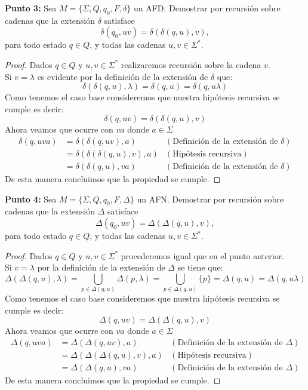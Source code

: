 \textbf{Punto 3: }Sea $M=\{\Sigma,Q,q_0,F,\delta\}$ un AFD. Demostrar por recursión sobre cadenas que la extensión $\delta$ satisface
$$\delta(q_0,uv)=\delta(\delta(q,u),v),$$
para todo estado $q\in Q$, y todas las cadenas $u,v\in\Sigma^*.$
\begin{proof}
Dados $q\in Q$ y $u,v\in\Sigma^*$ realizaremos recursión sobre la cadena $v$.\\
Si $v=\lambda$ es evidente por la definición de la extensión de $\delta$ que:
$$\delta(\delta(q,u),\lambda)=\delta(q,u)=\delta(q,u\lambda)$$
Como tenemos el caso base consideremos que nuestra hipótesis recursiva se cumple es decir:
$$\delta(q,uv)=\delta(\delta(q,u),v)$$ 
Ahora veamos que ocurre con $va$ donde $a\in\Sigma$
\begin{align*}
      \delta(q,uva)&=\delta(\delta(q,uv),a)&(\text{Definición de la extensión de }\delta)\\
      &=\delta(\delta(\delta(q,u),v),a)&(\text{Hipótesis recursiva})\\
      &=\delta(\delta(q,u),va)&(\text{Definición de la extensión de }\delta)
  \end{align*} 
De esta manera concluimos que la propiedad se cumple. 

\end{proof}
\textbf{Punto 4: }Sea $M=\{\Sigma,Q,q_0,F,\Delta\}$ un AFN. Demostrar por recursión sobre cadenas que la extensión $\Delta$ satisface
$$\Delta(q_0,uv)=\Delta(\Delta(q,u),v),$$
para todo estado $q\in Q$, y todas las cadenas $u,v\in\Sigma^*.$ 
\begin{proof}
Dados $q\in Q$ y $u,v\in\Sigma^*$ procederemos igual que en el punto anterior.\\
Si $v=\lambda$ por la definición de la extensión de $\Delta$ se tiene que:
$$\Delta(\Delta(q,u),\lambda)=\bigcup_{p\in\Delta(q,u)}\Delta(p,\lambda)=\bigcup_{p\in\Delta(q,u)}\{p\}=\Delta(q,u)=\Delta(q,u\lambda)$$ 
Como tenemos el caso base consideremos que nuestra hipótesis recursiva se cumple es decir:
$$\Delta(q,uv)=\Delta(\Delta(q,u),v)$$ 
Ahora veamos que ocurre con $va$ donde $a\in\Sigma$ 
\begin{align*}
    \Delta(q,uva)&=\Delta(\Delta(q,uv),a)&(\text{Definición de la extensión de }\Delta)\\
      &=\Delta(\Delta(\Delta(q,u),v),a)&(\text{Hipótesis recursiva})\\
      &=\Delta(\Delta(q,u),va)&(\text{Definición de la extensión de }\Delta)  
  \end{align*} 
De esta manera concluimos que la propiedad se cumple. 
 
\end{proof}

